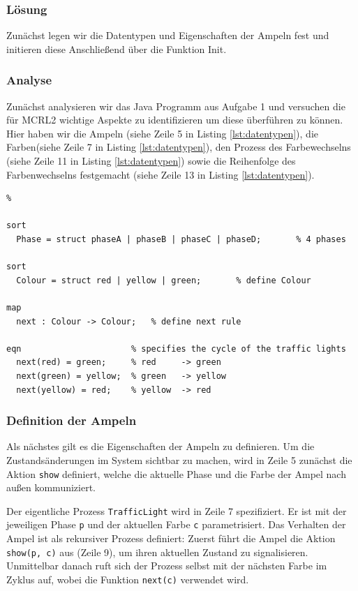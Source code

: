 \documentclass{article}
\begin{document}
\subsubsection*{Lösung}
Zunächst legen wir die Datentypen und Eigenschaften der Ampeln fest und initieren diese Anschließend über die Funktion Init.

\subsubsection{Analyse }
Zunächst analysieren wir das Java Programm aus Aufgabe 1 und versuchen die für MCRL2 wichtige Aspekte zu identifizieren um diese überführen zu können.
Hier haben wir die Ampeln (siehe Zeile 5 in Listing \ref{lst:datentypen}), die Farben(siehe Zeile 7 in Listing \ref{lst:datentypen}), den Prozess des Farbewechselns (siehe Zeile 11 in Listing \ref{lst:datentypen}) sowie die Reihenfolge des Farbenwechselns festgemacht (siehe Zeile 13 in Listing \ref{lst:datentypen}).

\begin{lstlisting}[caption={Definition der Datentypen und Farbregeln},label={lst:datentypen}]
% Definition of data types
%

sort
  Phase = struct phaseA | phaseB | phaseC | phaseD;       % 4 phases

sort
  Colour = struct red | yellow | green;       % define Colour

map
  next : Colour -> Colour;   % define next rule 

eqn                      % specifies the cycle of the traffic lights 
  next(red) = green;     % red     -> green
  next(green) = yellow;  % green   -> yellow
  next(yellow) = red;    % yellow  -> red
\end{lstlisting}


\subsubsection{Definition der Ampeln}

Als nächstes gilt es die Eigenschaften der Ampeln zu definieren. Um die Zustandsänderungen im System sichtbar zu machen, wird in Zeile 5 zunächst die Aktion \texttt{show} definiert, welche die aktuelle Phase und die Farbe der Ampel nach außen kommuniziert.

Der eigentliche Prozess \texttt{TrafficLight} wird in Zeile 7 spezifiziert. Er ist mit der jeweiligen Phase \texttt{p} und der aktuellen Farbe \texttt{c} parametrisiert. Das Verhalten der Ampel ist als rekursiver Prozess definiert: Zuerst führt die Ampel die Aktion \texttt{show(p, c)} aus (Zeile 9), um ihren aktuellen Zustand zu signalisieren. Unmittelbar danach ruft sich der Prozess selbst mit der nächsten Farbe im Zyklus auf, wobei die Funktion \texttt{next(c)} verwendet wird.
\end{document}
